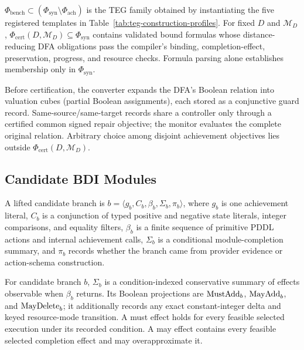 \begin{definition}
$\Phi_{\mathrm{bench}}\subset
(\Phi_{\mathrm{syn}}\setminus\Phi_{\mathrm{ach}})$ is the TEG family obtained by
instantiating the five registered templates in
Table~\ref{tab:teg-construction-profiles}. For fixed $D$ and $\mathcal M_D$,
$\Phi_{\mathrm{cert}}(D,\mathcal M_D)\subseteq\Phi_{\mathrm{syn}}$ contains
validated bound formulas whose distance-reducing DFA obligations pass the
compiler's binding, completion-effect, preservation, progress, and resource
checks. Formula parsing alone establishes
membership only in $\Phi_{\mathrm{syn}}$.

Before certification, the converter expands the DFA's Boolean relation into
valuation cubes (partial Boolean assignments), each stored as a conjunctive guard
record. Same-source/same-target records share a controller only through a
certified common signed repair objective; the monitor evaluates the complete
original relation. Arbitrary choice among disjoint achievement objectives lies
outside $\Phi_{\mathrm{cert}}(D,\mathcal M_D)$.
\end{definition}

\subsection{Candidate BDI Modules}

\begin{definition}
A lifted candidate branch is
$b=\langle g_b,C_b,\beta_b,\Sigma_b,\pi_b\rangle$, where $g_b$ is one
achievement literal, $C_b$ is a conjunction of typed positive and negative
state literals, integer comparisons, and equality filters, $\beta_b$ is a
finite sequence of primitive PDDL actions and internal achievement calls,
$\Sigma_b$ is a conditional module-completion summary, and $\pi_b$ records
whether the branch came from provider evidence or action-schema construction.
\end{definition}

\begin{definition}
For candidate branch $b$, $\Sigma_b$ is a condition-indexed conservative
summary of effects observable when $\beta_b$ returns. Its Boolean projections
are $\mathrm{MustAdd}_b$, $\mathrm{MayAdd}_b$, and $\mathrm{MayDelete}_b$; it additionally records any
exact constant-integer delta and keyed resource-mode transition. A must effect
holds for every feasible selected execution under its recorded condition. A may
effect contains every feasible selected completion effect and may overapproximate
it.
\end{definition}

